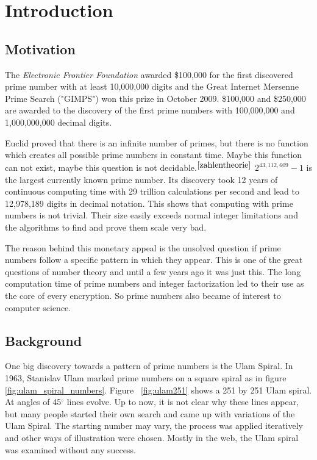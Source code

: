 \section{Introduction}
\label{sec:intro}

\subsection{Motivation}
The \emph{Electronic Frontier Foundation} awarded \$100,000 for the first discovered prime number with at least 10,000,000 digits and the Great Internet Mersenne Prime Search ("GIMPS") won this prize in October 2009. \$100,000 and \$250,000 are awarded to the discovery of the first prime numbers with 100,000,000 and 1,000,000,000 decimal digits.

Euclid proved that there is an infinite number of primes, but there is no function which creates all possible prime numbers in constant time. Maybe this function can not exist, maybe this question is not decidable.$^{\cite{zahlentheorie}}$ $2^{43,112,609}-1$ is the largest currently known prime number. Its discovery took 12 years of continuous computing time with 29 trillion calculations per second and lead to 12,978,189 digits in decimal notation. This shows that computing with prime numbers is not trivial. Their size easily exceeds normal integer limitations and the algorithms to find and prove them scale very bad.

The reason behind this monetary appeal is the unsolved question if prime numbers follow a specific pattern in which they appear. This is one of the great questions of number theory and until a few years ago it was just this. The long computation time of prime numbers and integer factorization led to their use as the core of every encryption. So prime numbers also became of interest to computer science.

\subsection{Background}
One big discovery towards a pattern of prime numbers is the Ulam Spiral. In 1963, Stanislav Ulam marked prime numbers on a square spiral as in figure \ref{fig:ulam_spiral_numbers}. Figure  ~\ref{fig:ulam251} shows a 251 by 251 Ulam spiral. At angles of 45$^\circ$ lines evolve. Up to now, it is not clear why these lines appear, but many people started their own search and came up with variations of the Ulam Spiral. The starting number may vary, the process was applied iteratively and other ways of illustration were chosen. Mostly in the web, the Ulam spiral was examined without any success.

